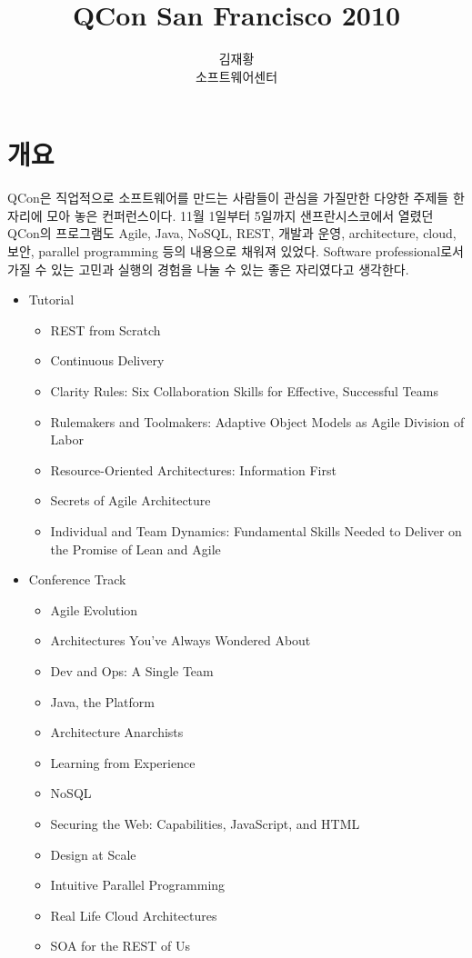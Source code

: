 \documentclass[11pt]{article}
\title{QCon San Francisco 2010}
\author{김재황 \\ 소프트웨어센터}
\begin{document}
\maketitle

\section{개요}

QCon은 직업적으로 소프트웨어를 만드는 사람들이 관심을 가질만한 
다양한 주제들 한 자리에 모아 놓은 컨퍼런스이다. 
11월 1일부터 5일까지 샌프란시스코에서 열렸던 QCon의 프로그램도 Agile, Java, 
NoSQL, REST, 개발과 운영, architecture, cloud, 보안, parallel programming
등의 내용으로 채워져 있었다.
Software professional로서 가질 수 있는 고민과 실행의 경험을 나눌 수 있는 
좋은 자리였다고 생각한다.

\begin{itemize}
\item Tutorial
    \begin{itemize}
    \item REST from Scratch
    \item Continuous Delivery
    \item  Clarity Rules: Six Collaboration Skills for Effective, Successful Teams
    \item Rulemakers and Toolmakers: Adaptive Object Models as Agile Division of Labor
    \item Resource-Oriented Architectures: Information First
    \item Secrets of Agile Architecture
    \item Individual and Team Dynamics: Fundamental Skills Needed to Deliver on the Promise of Lean and Agile
    \end{itemize}
\item Conference Track
    \begin{itemize}
    \item Agile Evolution
    \item Architectures You've Always Wondered About
    \item Dev and Ops: A Single Team
    \item Java, the Platform
    \item Architecture Anarchists
    \item Learning from Experience
    \item NoSQL
    \item Securing the Web: Capabilities, JavaScript, and HTML
    \item Design at Scale
    \item Intuitive Parallel Programming
    \item Real Life Cloud Architectures
    \item SOA for the REST of Us
    \end{itemize}
\end{itemize}
\end{document}
